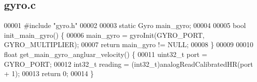 \subsection{gyro.\+c}
\label{gyro_8c_source}

\begin{DoxyCode}
00001 \textcolor{preprocessor}{#include "gyro.h"}
00002 
00003 \textcolor{keyword}{static} Gyro main_gyro;
00004 
00005 \textcolor{keywordtype}{bool} init_main_gyro() \{
00006   main_gyro = gyroInit(GYRO_PORT, GYRO_MULTIPLIER);
00007   \textcolor{keywordflow}{return} main_gyro != NULL;
00008 \}
00009 
00010 \textcolor{keywordtype}{float} get_main_gyro_angluar_velocity() \{
00011   uint32\_t port = GYRO_PORT;
00012   int32\_t reading = (int32\_t)analogReadCalibratedHR(port + 1);
00013   \textcolor{keywordflow}{return} 0;
00014 \}
\end{DoxyCode}
